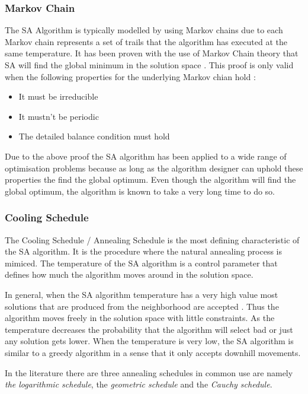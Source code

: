 \subsubsection{Markov Chain}
The SA Algorithm is typically modelled by using Markov chains due to each Markov chain represents a set of trails that the algorithm has executed at the same temperature.  It has been proven with the use of Markov Chain theory that SA will find the global minimum in the solution space \cite{ClusterSA}. This proof is only valid when the following properties for the underlying Markov chian hold \cite{VeryFastSAImageEnchancement}:
\begin{itemize}
\item It must be irreducible
\item It mustn't be periodic
\item The detailed balance condition must hold
\end{itemize}
Due to the above proof the SA algorithm has been applied to a wide range of optimisation problems because as long as the algorithm designer can uphold these properties the find the global optimum. Even though the algorithm will find the global optimum, the algorithm is known to take a very long time to do so.
\subsubsection{Cooling Schedule}
The Cooling Schedule / Annealing Schedule is the most defining characteristic of the SA algorithm. It is the procedure where the natural annealing process is mimiced. The temperature of the SA algorithm is a control parameter that defines how much the algorithm moves around in the solution space.

In general, when the SA algorithm temperature has a very high value most solutions that are produced from the neighborhood are accepted \cite{ClusterSA}. Thus the algorithm moves freely in the solution space with little constraints. As the temperature decreases the probability that the algorithm will select bad or just any solution gets lower. When the temperature is very low, the SA algorithm is similar to a greedy algorithm in a sense that it only accepts downhill movements\cite{ClusterSA}.

In the literature there are three annealing schedules in common use are namely \emph{the logarithmic schedule}, the \emph{geometric schedule} and the \emph{Cauchy schedule}\cite{VeryFastSAImageEnchancement,SASingleMultiObj}. 

